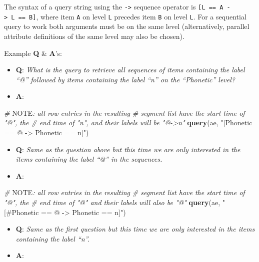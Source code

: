 \documentclass[]{book}
\newenvironment{Shaded}{\begin{snugshade}}{\end{snugshade}}
\newcommand{\AlertTok}[1]{\textcolor[rgb]{0.94,0.16,0.16}{#1}}
\newcommand{\CommentTok}[1]{\textcolor[rgb]{0.56,0.35,0.01}{\textit{#1}}}
\newcommand{\KeywordTok}[1]{\textcolor[rgb]{0.13,0.29,0.53}{\textbf{#1}}}
\newcommand{\NormalTok}[1]{#1}
\newcommand{\StringTok}[1]{\textcolor[rgb]{0.31,0.60,0.02}{#1}}
\providecommand{\tightlist}{%
  \setlength{\itemsep}{0pt}\setlength{\parskip}{0pt}}
\begin{document}
The syntax of a query string using the \texttt{-\textgreater{}} sequence operator is \texttt{{[}L\ ==\ A\ -\textgreater{}\ L\ ==\ B{]}}, where item \texttt{A} on level \texttt{L} precedes item \texttt{B} on level \texttt{L}. For a sequential query to work both arguments must be on the same level (alternatively, parallel attribute definitions of the same level may also be chosen).

Example \textbf{Q} \& \textbf{A}'s:

\begin{itemize}
\tightlist
\item
  \textbf{Q}: \emph{What is the query to retrieve all sequences of items containing the label ``@'' followed by items containing the label ``n'' on the ``Phonetic'' level?}
\item
  \textbf{A}:
\end{itemize}

\begin{Shaded}
\begin{Highlighting}[]
\CommentTok{# }\AlertTok{NOTE}\CommentTok{: all row entries in the resulting }
\CommentTok{# segment list have the start time of "@", the }
\CommentTok{# end time of "n", and their labels will be "@->n"}
\KeywordTok{query}\NormalTok{(ae, }\StringTok{"[Phonetic == @ -> Phonetic == n]"}\NormalTok{)}
\end{Highlighting}
\end{Shaded}

\begin{itemize}
\tightlist
\item
  \textbf{Q}: \emph{Same as the question above but this time we are only interested in the items containing the label ``@'' in the sequences.}
\item
  \textbf{A}:
\end{itemize}

\begin{Shaded}
\begin{Highlighting}[]
\CommentTok{# }\AlertTok{NOTE}\CommentTok{: all row entries in the resulting}
\CommentTok{# segment list have the start time of "@", the}
\CommentTok{# end time of "@" and their labels will also be "@"}
\KeywordTok{query}\NormalTok{(ae, }\StringTok{"[#Phonetic == @ -> Phonetic == n]"}\NormalTok{)}
\end{Highlighting}
\end{Shaded}

\begin{itemize}
\tightlist
\item
  \textbf{Q}: \emph{Same as the first question but this time we are only interested in the items containing the label ``n''.}
\item
  \textbf{A}:
\end{itemize}
\end{document}
